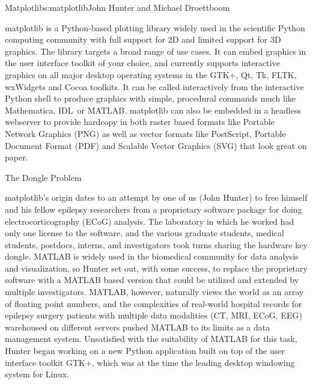 \begin{aosachapter}{Matplotlib}{s:matplotlib}{John Hunter and Michael Droettboom}


matplotlib is a Python-based plotting library widely used in
the scientific Python computing community with full support for 2D and
limited support for 3D graphics.  The library targets a broad range of
use cases.  It can embed graphics in the user interface toolkit of
your choice, and currently supports interactive graphics on all major
desktop operating systems in the GTK+, Qt, Tk, FLTK, wxWidgets and
Cocoa toolkits.  It can be called interactively from the
interactive Python shell to produce graphics with simple, procedural
commands much like Mathematica\texttrademark, IDL\texttrademark\ or
MATLAB\texttrademark.  matplotlib can also be embedded in a headless
webserver to provide hardcopy in both raster based formats like
Portable Network Graphics (PNG) as well as vector formats like
PostScript, Portable Document Format (PDF) and Scalable Vector
Graphics (SVG) that look great on paper.

\begin{aosasect1}{The Dongle Problem}

matplotlib's origin dates to an attempt by one of us (John Hunter) to
free himself and his fellow epilepsy researchers from a proprietary
software package for doing electrocorticography (ECoG) analysis.  The
laboratory in which he worked had only one license to the software,
and the various graduate students, medical students, postdocs, interns,
and investigators took turns sharing the hardware key dongle.
MATLAB is widely used in the biomedical community for
data analysis and visualization, so Hunter set out, with some success,
to replace the proprietary software with a MATLAB based version that
could be utilized and extended by multiple investigators.  MATLAB,
however, naturally views the world as an array of floating point
numbers, and the complexities of real-world hospital records for
epilepsy surgery patients with multiple data modalities (CT, MRI,
ECoG, EEG) warehoused on different servers pushed MATLAB to its limits
as a data management system.  Unsatisfied with the suitability of
MATLAB for this task, Hunter began working on a new Python application
built on top of the user interface toolkit GTK+, which was at the time
the leading desktop windowing system for Linux.


\end{aosasect1}
\end{aosachapter}
